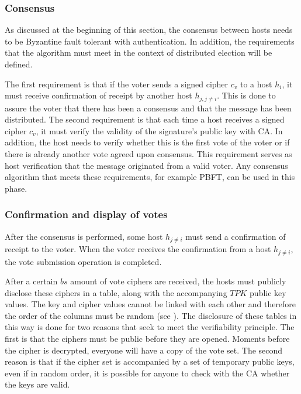 \documentclass[english]{textolivre}
\begin{document}
\subsubsection{Consensus}

As discussed at the beginning of this section, the consensus between hosts needs to be Byzantine fault tolerant with authentication. In addition, the requirements that the algorithm must meet in the context of distributed election will be defined.

The first requirement is that if the voter sends a signed cipher $c_{v}$ to a host $h_{i}$, it must receive confirmation of receipt by another host $h_{j, j \neq i}$. This is done to assure the voter that there has been a consensus and that the message has been distributed. The second requirement is that each time a host receives a signed cipher $c_{v}$, it must verify the validity of the signature's public key with CA. In addition, the host needs to verify whether this is the first vote of the voter or if there is already another vote agreed upon consensus. This requirement serves as host verification that the message originated from a valid voter. Any consensus algorithm that meets these requirements, for example PBFT, can be used in this phase.



\subsubsection{Confirmation and display of votes \label{sec-confirmation}}

After the consensus is performed, some host $h_{j \neq i}$ must send a confirmation of receipt to the voter. When the voter receives the confirmation from a host $h_{j \neq i}$, the vote submission operation is completed.

After a certain $bs$ amount of vote ciphers are received, the hosts must publicly disclose these ciphers in a table, along with the accompanying $TPK$ public key values. The key and cipher values cannot be linked with each other and therefore the order of the columns must be random (see ). The disclosure of these tables in this way is done for two reasons that seek to meet the verifiability principle. The first is that the ciphers must be public before they are opened. Moments before the cipher is decrypted, everyone will have a copy of the vote set. The second reason is that if the cipher set is accompanied by a set of temporary public keys, even if in random order, it is possible for anyone to check with the CA whether the keys are valid.
\end{document}
